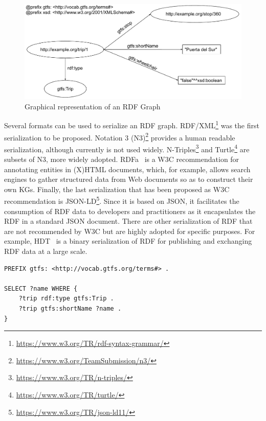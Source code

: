 \begin{figure}[!ht]
\centering
\includegraphics[width=\textwidth]{figures/state-of-the-art/RDF.pdf}
\caption{Graphical representation of an RDF Graph}
\label{fig:soa_rdf_example}
\end{figure}


Several formats can be used to serialize an RDF graph. RDF/XML\footnote{\url{https://www.w3.org/TR/rdf-syntax-grammar/}} was the first serialization to be proposed. Notation 3 (N3)\footnote{\url{https://www.w3.org/TeamSubmission/n3/}} provides a human readable serialization, although currently is not used widely. N-Triples\footnote{\url{https://www.w3.org/TR/n-triples/}} and Turtle\footnote{\url{https://www.w3.org/TR/turtle/}} are subsets of N3, more widely adopted. RDFa~\citep{adida2008rdfa} is a W3C recommendation for annotating entities in (X)HTML documents, which, for example, allows search engines to gather structured data from Web documents so as to construct their own KGs. Finally, the last serialization that has been proposed as W3C recommendation is JSON-LD\footnote{\url{https://www.w3.org/TR/json-ld11/}}. Since it is based on JSON, it facilitates the consumption of RDF data to developers and practitioners as it encapsulates the RDF in a standard JSON document. There are other serialization of RDF that are not recommended by W3C but are highly adopted for specific purposes. For example, HDT~\citep{fernandez2013binary} is a binary serialization of RDF for publishing and exchanging RDF data at a large scale.

\begin{lstlisting}[float,caption=Example of SPARQL query,frame=tlrb,label={list:soa_sparql_example}, columns=fullflexible]
PREFIX gtfs: <http://vocab.gtfs.org/terms#> .

SELECT ?name WHERE {
    ?trip rdf:type gtfs:Trip .
    ?trip gtfs:shortName ?name .
}
\end{lstlisting}
